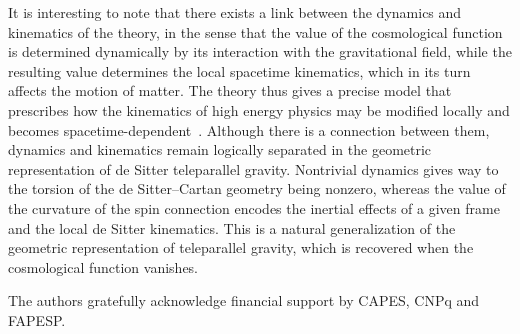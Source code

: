 \documentclass[%
aps,
prd,
reprint
]{revtex4-1}
\begin{document}
It is interesting to note that there exists a link between the 
dynamics and kinematics of the theory, in the sense that the 
value of the cosmological function is determined dynamically by 
its interaction with the gravitational field, while the resulting 
value determines the local spacetime kinematics, which in its 
turn affects the motion of matter. The theory thus gives 
a precise model that prescribes how the kinematics of high energy 
physics may be modified locally and becomes 
spacetime-dependent~\cite{Mansouri:2002cg}. Although there is 
a connection between them, dynamics and kinematics remain 
logically separated in the geometric representation of de Sitter 
teleparallel gravity. Nontrivial dynamics gives way to the 
torsion of the de Sitter--Cartan geometry being nonzero, whereas 
the value of the curvature of the spin connection encodes the 
inertial effects of a given frame and the local de Sitter 
kinematics. This is a natural generalization of the geometric 
representation of teleparallel gravity, which is recovered when 
the cosmological function vanishes.

\begin{acknowledgments}
The authors gratefully acknowledge financial support by CAPES, 
CNPq and FAPESP.%
\end{acknowledgments}


\end{document}
